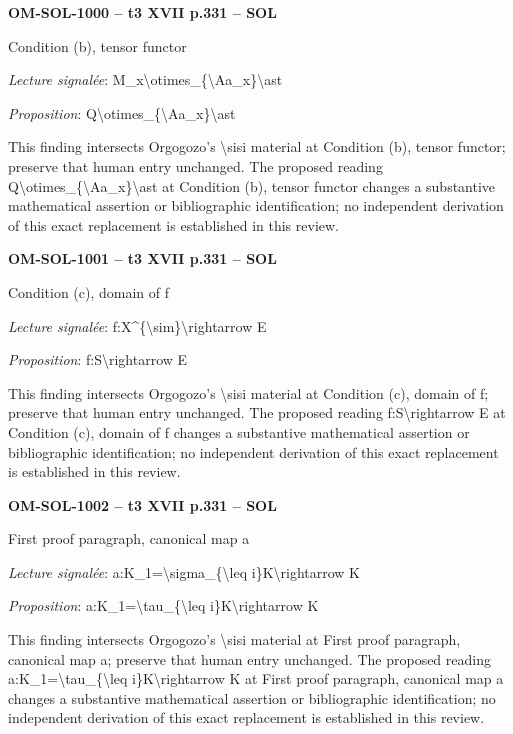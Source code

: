 \par\noindent\textbf{OM-SOL-1000 -- t3 XVII p.331 -- SOL}\par
Condition (b), tensor functor\par
\emph{Lecture signalée}: M\_x\textbackslash{}otimes\_\{\textbackslash{}Aa\_x\}\textbackslash{}ast\par
\emph{Proposition}: Q\textbackslash{}otimes\_\{\textbackslash{}Aa\_x\}\textbackslash{}ast\par
This finding intersects Orgogozo's \textbackslash{}sisi material at Condition (b), tensor functor; preserve that human entry unchanged. The proposed reading Q\textbackslash{}otimes\_\{\textbackslash{}Aa\_x\}\textbackslash{}ast at Condition (b), tensor functor changes a substantive mathematical assertion or bibliographic identification; no independent derivation of this exact replacement is established in this review.\par
\par\noindent\textbf{OM-SOL-1001 -- t3 XVII p.331 -- SOL}\par
Condition (c), domain of f\par
\emph{Lecture signalée}: f:X\textasciicircum{}\{\textbackslash{}sim\}\textbackslash{}rightarrow E\par
\emph{Proposition}: f:S\textbackslash{}rightarrow E\par
This finding intersects Orgogozo's \textbackslash{}sisi material at Condition (c), domain of f; preserve that human entry unchanged. The proposed reading f:S\textbackslash{}rightarrow E at Condition (c), domain of f changes a substantive mathematical assertion or bibliographic identification; no independent derivation of this exact replacement is established in this review.\par
\par\noindent\textbf{OM-SOL-1002 -- t3 XVII p.331 -- SOL}\par
First proof paragraph, canonical map a\par
\emph{Lecture signalée}: a:K\_1=\allowbreak \textbackslash{}sigma\_\{\textbackslash{}leq i\}K\textbackslash{}rightarrow K\par
\emph{Proposition}: a:K\_1=\allowbreak \textbackslash{}tau\_\{\textbackslash{}leq i\}K\textbackslash{}rightarrow K\par
This finding intersects Orgogozo's \textbackslash{}sisi material at First proof paragraph, canonical map a; preserve that human entry unchanged. The proposed reading a:K\_1=\allowbreak \textbackslash{}tau\_\{\textbackslash{}leq i\}K\textbackslash{}rightarrow K at First proof paragraph, canonical map a changes a substantive mathematical assertion or bibliographic identification; no independent derivation of this exact replacement is established in this review.\par
